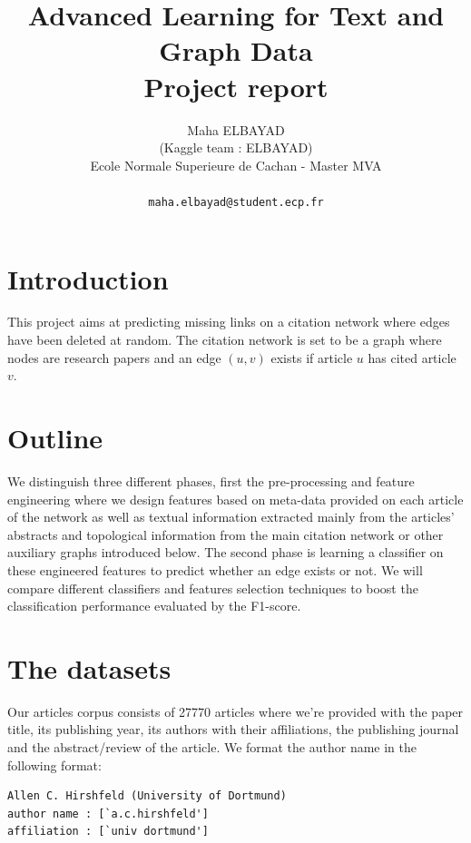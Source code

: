 \documentclass{acmsiggraph}
\title{Advanced Learning for Text and Graph Data\\
Project report}
\author{Maha ELBAYAD\\
{\large (Kaggle team : ELBAYAD)}\\
\large{Ecole Normale Superieure de Cachan - Master MVA}\\
\\\texttt{maha.elbayad@student.ecp.fr}}
\begin{document}
\maketitle

\section{Introduction}
This project aims at predicting missing links on a citation network where edges have been deleted at random. The citation network is set to be a graph where nodes are research papers and an edge $(u,v)$ exists if article $u$ has cited article $v$.

\section{Outline}
We distinguish three different phases, first the pre-processing and feature engineering where we design features based on meta-data provided on each article of the network as well as textual information extracted mainly from the articles' abstracts and topological information from the main citation network or other auxiliary graphs introduced below. The second phase is learning a classifier on these engineered features to predict whether an edge exists or not. We will compare different classifiers and features selection techniques to boost the classification performance evaluated by the F1-score.

\section{The datasets}
Our articles corpus consists of 27770 articles where we're provided with the paper title, its publishing year, its authors with their affiliations, the publishing journal and the abstract/review of the article. We format the author name in the following format:

\begin{lstlisting}
Allen C. Hirshfeld (University of Dortmund)
author name : [`a.c.hirshfeld']
affiliation : [`univ dortmund']
\end{lstlisting}
\end{document}

